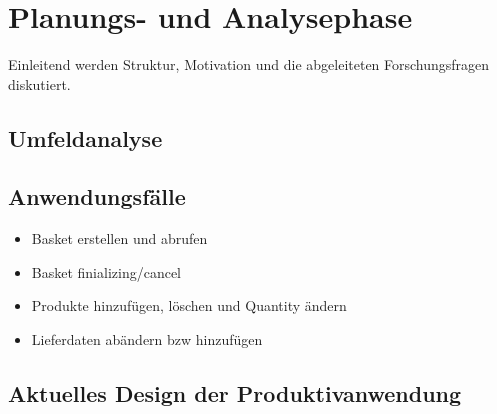 

\chapter{Planungs- und Analysephase}

Einleitend werden Struktur, Motivation und die abgeleiteten Forschungsfragen diskutiert.

\section{Umfeldanalyse}
\blindtext

\section{Anwendungsfälle}

\begin{itemize}[noitemsep,nolistsep]
	\item Basket erstellen und abrufen
	\item Basket finializing/cancel
	\item Produkte hinzufügen, löschen und Quantity ändern
	\item Lieferdaten abändern bzw hinzufügen
\end{itemize}

\blindtext


\section{Aktuelles Design der Produktivanwendung}
\blindtext

